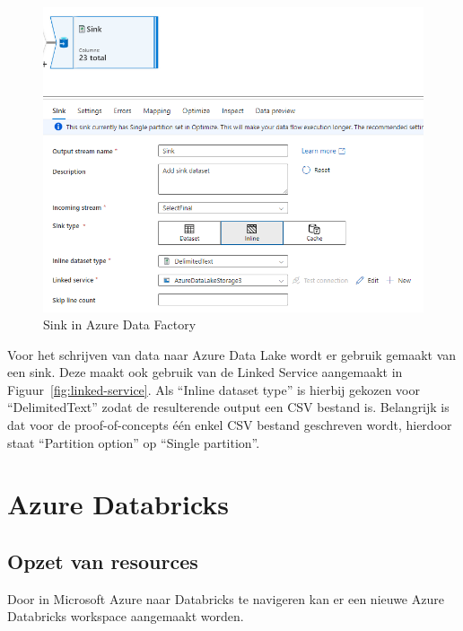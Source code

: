 \begin{figure}[H]
    \includegraphics[width=1\textwidth]{./graphics/adf/sink.png}
    \caption{Sink in Azure Data Factory}
\end{figure}

Voor het schrijven van data naar Azure Data Lake wordt er gebruik gemaakt van een sink. Deze maakt ook gebruik van de Linked Service aangemaakt in Figuur~\ref{fig:linked-service}. Als ``Inline dataset type'' is hierbij gekozen voor ``DelimitedText'' zodat de resulterende output een CSV bestand is. Belangrijk is dat voor de proof-of-concepts één enkel CSV bestand geschreven wordt, hierdoor staat ``Partition option'' op ``Single partition''. 

\section{Azure Databricks}

\subsection{Opzet van resources}

Door in Microsoft Azure naar Databricks te navigeren kan er een nieuwe Azure Databricks workspace aangemaakt worden.

